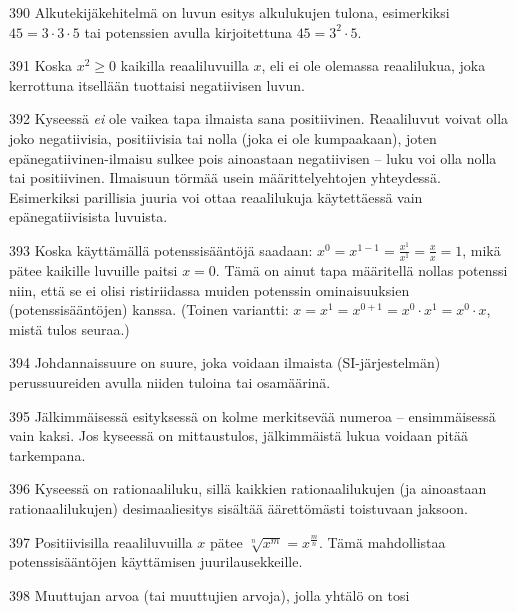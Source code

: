 \begin{Vastaus}{390}
Alkutekijäkehitelmä on luvun esitys alkulukujen tulona, esimerkiksi $45=3\cdot 3 \cdot 5$ tai potenssien avulla kirjoitettuna $45=3^2\cdot 5$.
\end{Vastaus}
\begin{Vastaus}{391}
Koska $x^2 \geq 0$ kaikilla reaaliluvuilla $x$, eli ei ole olemassa reaalilukua, joka kerrottuna itsellään tuottaisi negatiivisen luvun.
\end{Vastaus}
\begin{Vastaus}{392}
Kyseessä \textit{ei} ole vaikea tapa ilmaista sana positiivinen. Reaaliluvut voivat olla joko negatiivisia, positiivisia tai nolla (joka ei ole kumpaakaan), joten epänegatiivinen-ilmaisu sulkee pois ainoastaan negatiivisen -- luku voi olla nolla tai positiivinen. Ilmaisuun törmää usein määrittelyehtojen yhteydessä. Esimerkiksi parillisia juuria voi ottaa reaalilukuja käytettäessä vain epänegatiivisista luvuista.
\end{Vastaus}
\begin{Vastaus}{393}
Koska käyttämällä potenssisääntöjä saadaan: $x^0=x^{1-1}=\frac{x^1}{x^1}=\frac{x}{x}=1$, mikä pätee kaikille luvuille paitsi $x=0$. Tämä on ainut tapa määritellä nollas potenssi niin, että se ei olisi ristiriidassa muiden potenssin ominaisuuksien (potenssisääntöjen) kanssa. (Toinen variantti: $x=x^1=x^{0+1}=x^0 \cdot x^1 = x^0 \cdot x$, mistä tulos seuraa.)
\end{Vastaus}
\begin{Vastaus}{394}
Johdannaissuure on suure, joka voidaan ilmaista (SI-järjestelmän) perussuureiden avulla niiden tuloina tai osamäärinä.
\end{Vastaus}
\begin{Vastaus}{395}
Jälkimmäisessä esityksessä on kolme merkitsevää numeroa -- ensimmäisessä vain kaksi. Jos kyseessä on mittaustulos, jälkimmäistä lukua voidaan pitää tarkempana.
\end{Vastaus}
\begin{Vastaus}{396}
Kyseessä on rationaaliluku, sillä kaikkien rationaalilukujen (ja ainoastaan rationaalilukujen) desimaaliesitys sisältää äärettömästi toistuvaan jaksoon.
\end{Vastaus}
\begin{Vastaus}{397}
Positiivisilla reaaliluvuilla $x$ pätee $\sqrt[n]{x^m} = x^{\frac{m}{n}}$. Tämä mahdollistaa potenssisääntöjen käyttämisen juurilausekkeille.
\end{Vastaus}
\begin{Vastaus}{398}
Muuttujan arvoa (tai muuttujien arvoja), jolla yhtälö on tosi
\end{Vastaus}
